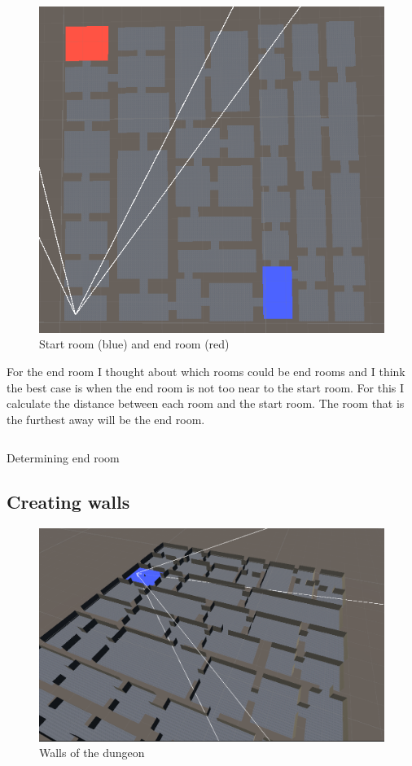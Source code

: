 \documentclass[a4paper,11pt,oneside]{scrreprt}
\begin{document}
\begin{figure}[ht]
	\centering
	\includegraphics[scale=0.5]{images/start_end_room.png}   
	\caption{Start room (blue) and end room (red)}
	\label{fig:start-end-room}
\end{figure}

For the end room I thought about which rooms could be end rooms and I think the best case is when the end room is not too near to the start room. For this I calculate the distance between each room and the start room. The room that is the furthest away will be the end room.
\begin{listing}[ht]
    \inputminted[fontsize=\footnotesize,linenos]{csharp}{code/EndRoom.cs}
    \caption[Determining end room]{Determining end room}
    \label{code:Determining-end-room}
\end{listing}

\subsection{Creating walls}
\label{subsection:creating-walls}
\begin{figure}[htb]
	\centering
	\includegraphics[scale=0.4]{images/walls.png}   
	\caption{Walls of the dungeon}
	\label{fig:walls}
\end{figure}
\end{document}
